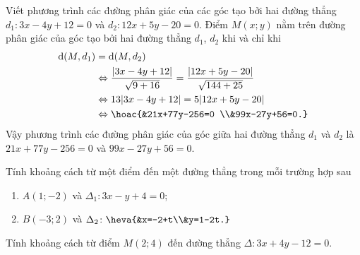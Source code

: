 \begin{bt}%
	Viết phương trình các đường phân giác của các góc tạo bởi hai đường thẳng $d_1\colon 3x-4y+12=0$ và $d_2\colon 12x+5y-20=0$.
	\loigiai
	{Điểm $M(x;y)$ nằm trên đường phân giác của góc tạo bởi hai đường thẳng $d_1$, $d_2$ khi và chỉ khi
		\begin{align*}
			\mathrm{d}(M,d_1)&=\mathrm{d}(M,d_2)\\
			&\Leftrightarrow \dfrac{|3x-4y+12|}{\sqrt{9+16}}=\dfrac{|12x+5y-20|}{\sqrt{144+25}}\\
			&\Leftrightarrow 13|3x-4y+12|=5|12x+5y-20|\\
			&\Leftrightarrow \hoac{&21x+77y-256=0 \\&99x-27y+56=0.}
		\end{align*}
		Vậy phương trình các đường phân giác của góc giữa hai đường thẳng $d_1$ và $d_2$ là $21x+77y-256=0$ và $99x-27y+56=0$.}
\end{bt}

\begin{bt}%
	Tính khoảng cách từ một điểm đến một đường thẳng trong mỗi trường hợp sau
	\begin{enumerate}
		\item $A(1;-2)$ và $\Delta_1\colon 3x-y+4=0$;
		\item $B(-3;2)$ và $\Delta_2\colon \heva{&x=-2+t\\&y=1-2t.}$
	\end{enumerate}
\end{bt}

\begin{bt}%
	Tính khoảng cách từ điểm $M(2;4)$ đến đường thẳng $\Delta\colon 3x+4y-12=0$.
\end{bt}

